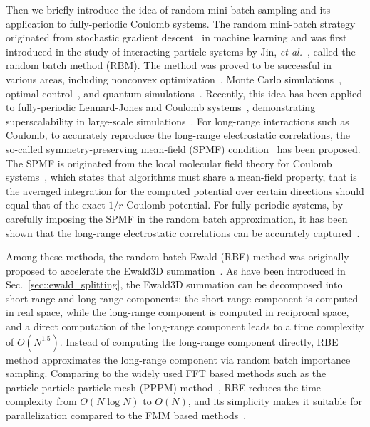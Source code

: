 Then we briefly introduce the idea of random mini-batch sampling and its application to fully-periodic Coulomb systems.
The random mini-batch strategy originated from stochastic gradient descent~\cite{robbins1951stochastic} in machine learning and was first introduced in the study of interacting particle systems by Jin, {\it et al.}~\cite{jin2020random}, called the random batch method (RBM).
The method was proved to be successful in various areas, including nonconvex optimization~\cite{ghadimi2016mini}, Monte Carlo simulations~\cite{li2020random}, optimal control~\cite{ko2021model}, and quantum simulations~\cite{jin2021randomquantum}. 
Recently, this idea has been applied to fully-periodic Lennard-Jones and Coulomb systems~\cite{liang2021random, jin2021random, liang2023SISC}, demonstrating superscalability in large-scale simulations~\cite{liang2022superscalability, liang2022improved,gao2024rbmdmoleculardynamicspackage}. 
For long-range interactions such as Coulomb, to accurately reproduce the long-range electrostatic correlations, the so-called symmetry-preserving mean-field (SPMF) condition~\cite{hu2014symmetry} has been proposed. 
The SPMF is originated from the local molecular field theory for Coulomb systems~\cite{chen2006local, hu2010efficient}, which states that algorithms must share a mean-field property, that is
the averaged integration for the computed potential over certain directions should equal that of the exact $1/r$ Coulomb potential.
For fully-periodic systems, by carefully imposing the SPMF in the random batch approximation, it has been shown that the long-range electrostatic correlations can be accurately captured~\cite{gao2023JCTC}.

Among these methods, the random batch Ewald (RBE) method was originally proposed to accelerate the Ewald3D summation~\cite{jin2021random}.
As have been introduced in Sec.~\ref{sec::ewald_splitting}, the Ewald3D summation can be decomposed into short-range and long-range components: the short-range component is computed in real space, while the long-range component is computed in reciprocal space, and a direct computation of the long-range component leads to a time complexity of $O(N^{1.5})$.
Instead of computing the long-range component directly, RBE method approximates the long-range component via random batch importance sampling.
Comparing to the widely used FFT based methods such as the particle-particle particle-mesh (PPPM) method~\cite{hockney2021computer,darden1993particle,essmann1995smooth}, RBE reduces the time complexity from $O(N\log N)$ to $O(N)$, and its simplicity makes it suitable for parallelization compared to the FMM based methods~\cite{greengard1987fast,cheng1999fast,ying2004kernel}.

